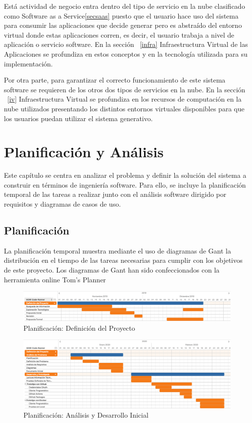 \documentclass[a4paper,11pt]{book}
\begin{document}
Está actividad de negocio entra dentro del tipo de servicio en la nube clasificado como Software as a Service\ref{secsaas} puesto que el usuario hace uso del sistema para consumir las aplicaciones que decide generar pero es abstraído del entorno virtual donde estas aplicaciones corren, es decir, el usuario trabaja a nivel de aplicación o servicio software. En la sección ~\ref{infra}  Infraestructura Virtual de las Aplicaciones se profundiza en estos conceptos y en la tecnología utilizada para su implementación. 

Por otra parte, para garantizar el correcto funcionamiento de este sistema software se requieren de los otros dos tipos de servicios en la nube. En la sección ~\ref{iv} Infraestructura Virtual se profundiza en los recursos de computación en la nube utilizados presentando los distintos entornos virtuales disponibles para que los usuarios puedan utilizar el sistema generativo.


\chapter{Planificación y Análisis}

Este capítulo se centra en analizar el problema y definir la solución del sistema a construir en términos de ingeniería software. Para ello, se incluye la planificación temporal de las tareas a realizar junto con el análisis software dirigido por requisitos y diagramas de casos de uso.

\section{Planificación}

La planificación temporal muestra mediante el uso de diagramas de Gant la distribución en el tiempo de las tareas necesarias para cumplir con los objetivos de este proyecto. Los diagramas de Gant han sido confeccionados con la herramienta online Tom's Planner~\cite{tom}

\begin{figure}[H]
\centering
\includegraphics[scale=0.20]{imagenes/gant1.png}
\caption{ Planificación: Definición del Proyecto}
\end{figure}

\begin{figure}[H]
\centering
\includegraphics[scale=0.20]{imagenes/gant2.png}
\caption{ Planificación: Análisis y Desarrollo Inicial }
\end{figure}
\end{document}
